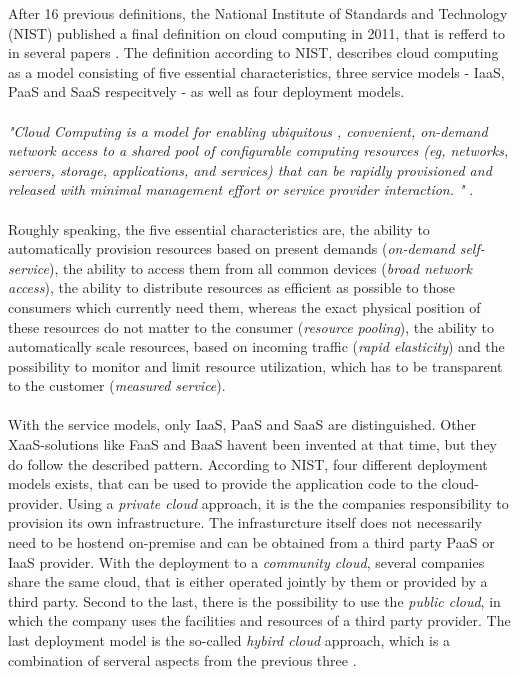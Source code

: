 \documentclass[11pt]{article}
\begin{document}
After 16 previous definitions, the National Institute of Standards and Technology (NIST) published a final definition on cloud computing in 2011, that is refferd to in several papers \cite{mell2011nist}. The definition according to NIST, describes cloud computing as a model consisting of five essential characteristics, three service models - IaaS, PaaS and SaaS respecitvely - as well as four deployment models. \\\\\textit{"Cloud Computing is a model for enabling ubiquitous , convenient, on-demand network access to a shared pool of configurable computing resources (eg, networks, servers, storage, applications, and services) that can be rapidly provisioned and released with minimal management effort or service provider interaction. "} \cite{mell2011nist}. \\\\Roughly speaking, the five essential characteristics are, the ability to automatically provision resources based on present demands (\textit{on-demand self-service}), the ability to access them from all common devices (\textit{broad network access}), the ability to distribute resources as efficient as possible to those consumers which currently need them, whereas the exact physical position of these resources do not matter to the consumer (\textit{resource pooling}), the ability to automatically scale resources, based on incoming traffic (\textit{rapid elasticity}) and the possibility to monitor and limit resource utilization, which has to be transparent to the customer (\textit{measured service}). \\\\With the service models, only IaaS, PaaS and SaaS are distinguished. Other XaaS-solutions like FaaS and BaaS havent been invented at that time, but they do follow the described pattern. According to NIST, four different deployment models exists, that can be used to provide the application code to the cloud-provider. Using a \textit{private cloud} approach, it is the the companies responsibility to provision its own infrastructure. The infrasturcture itself does not necessarily need to be hostend on-premise and can be obtained from a third party PaaS or IaaS provider. With the deployment to a \textit{community cloud}, several companies share the same cloud, that is either operated jointly by them or provided by a third party. Second to the last, there is the possibility to use the \textit{public cloud}, in which the company uses the facilities and resources of a third party provider. The last deployment model is the so-called \textit{hybird cloud} approach, which is a combination of serveral aspects from the previous three \cite{mell2011nist}.
\end{document}
